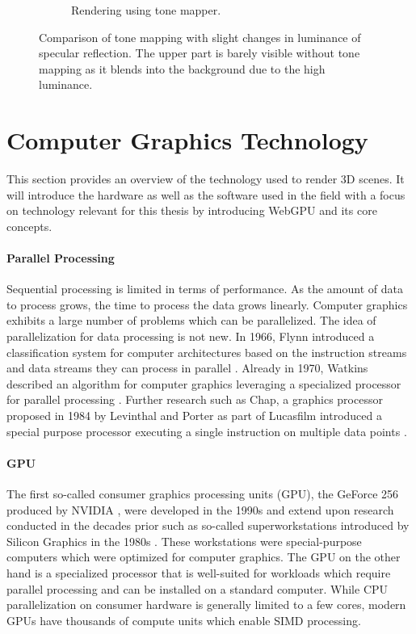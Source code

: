 \begin{figure}[H]
\begin{subfigure}[t]{0.3\textwidth}
    \caption{Rendering using tone mapper.}
    \label{fig:tone-mapping-applied}
  \end{subfigure}
  \hspace*{2cm}
  \caption{Comparison of tone mapping with slight changes in luminance of specular reflection. The upper part is barely visible without tone mapping as it blends into the background due to the high luminance.}
  \label{fig:tone-mapping}
\end{figure}

\section{Computer Graphics Technology}

This section provides an overview of the technology used to render 3D scenes. It will introduce the hardware as well as the software used in the field with a focus on technology relevant for this thesis by introducing \gls{WebGPU} and its core concepts.

\paragraph{Parallel Processing}

Sequential processing is limited in terms of performance. As the amount of data to process grows, the time to process the data grows linearly. Computer graphics exhibits a large number of problems which can be parallelized. The idea of parallelization for data processing is not new. In 1966, Flynn introduced a classification system for computer architectures based on the instruction streams and data streams they can process in parallel \cite{flynnTaxonomy,flynnTaxonomy2}. Already in 1970, Watkins described an algorithm for computer graphics leveraging a specialized processor for parallel processing \cite{surfaceAlgorithmProcessor}. Further research such as Chap, a  graphics processor proposed in 1984 by Levinthal and Porter as part of Lucasfilm introduced a special purpose processor executing a single instruction on multiple data points \cite{chapSIMDgpu}.

\paragraph{GPU}

The first so-called consumer graphics processing units (\gls{GPU}), the GeForce 256 produced by NVIDIA \cite{evolutionOfGPU}, were developed in the 1990s and extend upon research conducted in the decades prior such as so-called superworkstations introduced by Silicon Graphics in the 1980s \cite{sigWorkstation}. These workstations were special-purpose computers which were optimized for computer graphics. The \gls{GPU} on the other hand is a specialized processor that is well-suited for workloads which require parallel processing and can be installed on a standard computer. While \gls{CPU} parallelization on consumer hardware is generally limited to a few cores, modern \glspl{GPU} have thousands of compute units which enable \gls{SIMD} processing.

